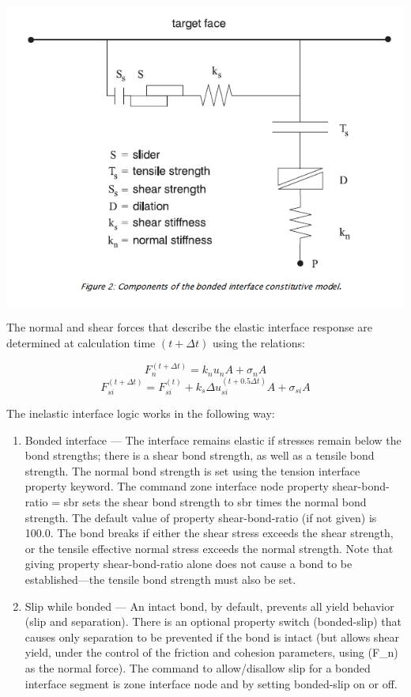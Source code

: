 \documentclass[a4paper, nobind]{templates/ociamthesis}
\begin{document}
\includegraphics[width=1\linewidth]{myfigureeeeee/interface-constitutive}

The normal and shear forces that describe the elastic interface response
are determined at calculation time \((t + \Delta t)\) using the relations:

\[ F_n^{(t + \Delta t)} = k_n u_n A + \sigma_n A  \]
\[ F_{si}^{(t + \Delta t)} = F_{si}^{(t)} + k_s \Delta u_{si}^{(t + 0.5 \Delta t)} A + \sigma_{si} A\]

The inelastic interface logic works in the following way:

\begin{enumerate}
\def\labelenumi{\arabic{enumi}.}
\item
  Bonded interface --- The interface remains elastic if stresses
  remain below the bond strengths; there is a shear bond strength, as
  well as a tensile bond strength. The normal bond strength is set
  using the tension interface property keyword. The command zone
  interface node property shear-bond-ratio = sbr sets the shear bond
  strength to sbr times the normal bond strength. The default value of
  property shear-bond-ratio (if not given) is 100.0. The bond breaks
  if either the shear stress exceeds the shear strength, or the
  tensile effective normal stress exceeds the normal strength. Note
  that giving property shear-bond-ratio alone does not cause a bond to
  be established---the tensile bond strength must also be set.\\
\item
  Slip while bonded --- An intact bond, by default, prevents all yield
  behavior (slip and separation). There is an optional property switch
  (bonded-slip) that causes only separation to be prevented if the
  bond is intact (but allows shear yield, under the control of the
  friction and cohesion parameters, using (F\_n) as the normal force).
  The command to allow/disallow slip for a bonded interface segment is
  zone interface node and by setting bonded-slip on or off.\\
\end{enumerate}
\end{document}
